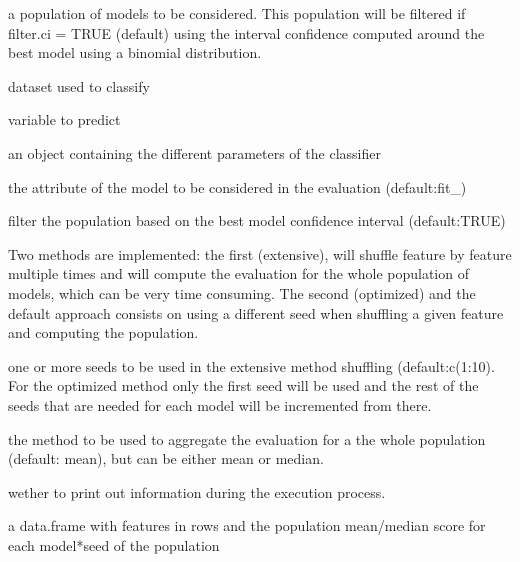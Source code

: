 \documentclass[a4paper]{book}
\begin{document}
\begin{Arguments}
\begin{ldescription}
\item[\code{pop:}] a population of models to be considered. This population will be filtered if filter.ci = TRUE (default) using the interval 
confidence computed around the best model using a binomial distribution.

\item[\code{X:}] dataset used to classify

\item[\code{y:}] variable to predict

\item[\code{clf:}] an object containing the different parameters of the classifier

\item[\code{score:}] the attribute of the model to be considered in the evaluation (default:fit\_)

\item[\code{filter.ci:}] filter the population based on the best model confidence interval (default:TRUE)

\item[\code{method:}] Two methods are implemented: the first (extensive), will shuffle feature by feature multiple times and will compute the 
evaluation for the whole population of models, which can be very time consuming. The second (optimized) and the default approach consists 
on using a different seed when shuffling a given feature and computing the population.

\item[\code{seed:}] one or more seeds to be used in the extensive method shuffling (default:c(1:10). For the optimized method only the first seed will be used 
and the rest of the seeds that are needed for each model will be incremented from there.

\item[\code{aggregation:}] the method to be used to aggregate the evaluation for a the whole population (default: mean), but can be either mean or median.

\item[\code{verbose:}] wether to print out information during the execution process.
\end{ldescription}
\end{Arguments}
%
\begin{Value}
a data.frame with features in rows and the population mean/median score for each model*seed of the population
\end{Value}
\end{document}

